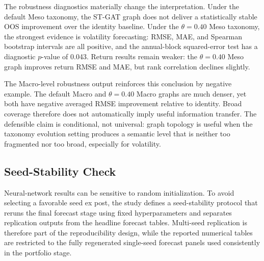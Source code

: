 \documentclass[11pt, a4paper]{article}
\begin{document}
\begin{table}[H]
\centering
\caption{Robust OOS improvement diagnostics versus identity baseline. Positive values favor ST-GAT.}
\label{tab:robust_oos}
\vspace{0.2cm}
\renewcommand{\arraystretch}{1.18}
\end{table}

The robustness diagnostics materially change the interpretation. Under the default Meso taxonomy, the ST-GAT graph does not deliver a statistically stable OOS improvement over the identity baseline. Under the $\theta=0.40$ Meso taxonomy, the strongest evidence is volatility forecasting: RMSE, MAE, and Spearman bootstrap intervals are all positive, and the annual-block squared-error test has a diagnostic $p$-value of 0.043. Return results remain weaker: the $\theta=0.40$ Meso graph improves return RMSE and MAE, but rank correlation declines slightly.

The Macro-level robustness output reinforces this conclusion by negative example. The default Macro and $\theta=0.40$ Macro graphs are much denser, yet both have negative averaged RMSE improvement relative to identity. Broad coverage therefore does not automatically imply useful information transfer. The defensible claim is conditional, not universal: graph topology is useful when the taxonomy evolution setting produces a semantic level that is neither too fragmented nor too broad, especially for volatility.

\subsection{Seed-Stability Check}
Neural-network results can be sensitive to random initialization. To avoid selecting a favorable seed ex post, the study defines a seed-stability protocol that reruns the final forecast stage using fixed hyperparameters and separates replication outputs from the headline forecast tables. Multi-seed replication is therefore part of the reproducibility design, while the reported numerical tables are restricted to the fully regenerated single-seed forecast panels used consistently in the portfolio stage.
\end{document}
